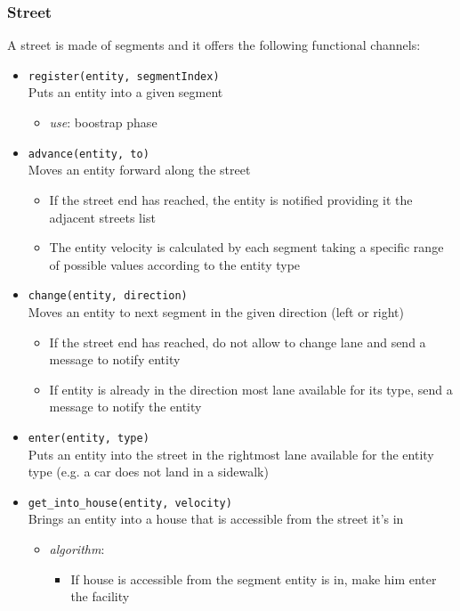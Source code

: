 \subsubsection{Street}
A street is made of segments and it offers the following functional channels:
\begin{itemize}
	\item \texttt{register(entity, segmentIndex)}
	\\Puts an entity into a given segment		
	\begin{itemize}
		\item \textit{use}: boostrap phase
	\end{itemize}
	\item \texttt{advance(entity, to)}
	\\Moves an entity forward along the street	
	\begin{itemize} 
		\item If the street end has reached, the entity is notified providing it the adjacent streets list
		\item The entity velocity is calculated by each segment taking a specific range of possible values according to the entity type
	\end{itemize}
	\item \texttt{change(entity, direction)}
	\\Moves an entity to next segment in the given direction (left or right)	
	\begin{itemize}		
		\item If the street end has reached, do not allow to change lane and send a message to notify entity
		\item If entity is already in the direction most lane available for its type, send a message to notify the entity
	\end{itemize}
	\item \texttt{enter(entity, type)}
	\\Puts an entity into the street in the rightmost lane available for the entity type (e.g. a car does not land in a sidewalk)
	\item \texttt{get\_into\_house(entity, velocity)}
	\\Brings an entity into a house that is accessible from the street it’s in
	\begin{itemize}
		\item \textit{algorithm}:
		\begin{itemize}
			\item If house is accessible from the segment entity is in, make him enter the facility

\end{itemize}
\end{itemize}
\end{itemize}
